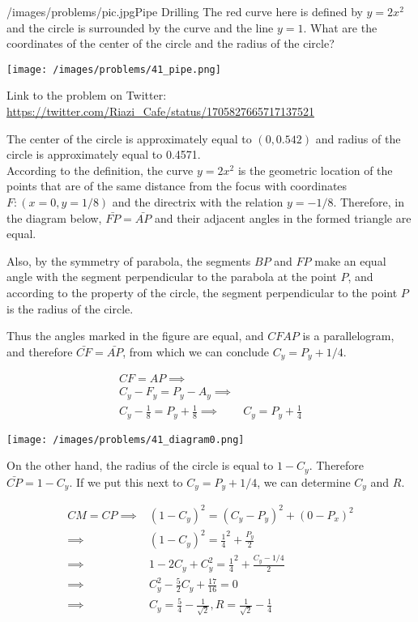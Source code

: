 \begin{problem}{/images/problems/pic.jpg}{Pipe Drilling}
	The red curve here is defined by $y = 2x^2$ and the circle is surrounded by the curve and the line $y=1$. What are the coordinates of the center of the circle and the radius of the circle?

\begin{center}
	\texttt{[image: /images/problems/41\_pipe.png]}
\end{center}

Link to the problem on Twitter: \url{https://twitter.com/Riazi_Cafe/status/1705827665717137521}
\end{problem}
\begin{solution}
The center of the circle is approximately equal to $(0,0.542)$ and radius of the circle is approximately equal to 0.4571.\\[0.2cm]

According to the definition, the curve $y=2x^2$ is the geometric location of the points that are of the same distance from the focus with coordinates $F: (x=0, y=1/8)$ and the directrix with the relation $y=-1/8$.
Therefore, in the diagram below, $\bar{FP}=\bar{AP}$ and their adjacent angles in the formed triangle are equal.

Also, by the symmetry of parabola, the segments $BP$ and $FP$ make an equal angle with the segment perpendicular to the parabola at the point $P$, and according to the property of the circle, the segment perpendicular to the point $P$ is the radius of the circle.

Thus the angles marked in the figure are equal, and $CFAP$ is a parallelogram, and therefore $\bar{CF}=\bar{AP}$, from which we can conclude $C_y=P_y+1/4$.

$$\begin{aligned}
CF = AP \implies& \\
C_y - F_y = P_y - A_y \implies& \\
C_y - \frac{1}{8} = P_y + \frac{1}{8} \implies& C_y=P_y+\frac{1}{4}
\end{aligned}$$

\begin{center}
	\texttt{[image: /images/problems/41\_diagram0.png]}
\end{center}

On the other hand, the radius of the circle is equal to $1-C_y$. Therefore $\bar{CP}=1-C_y$. If we put this next to $C_y=P_y+1/4$, we can determine $C_y$ and $R$.

$$\begin{aligned}
CM = CP \implies& (1 - C_y)^2 = (C_y - P_y)^2 + (0 - P_x)^2 \\
\implies& (1 - C_y)^2 = \frac{1}{4}^2 + \frac{P_y}{2} \\
\implies& 1 - 2C_y + C_y^2  = \frac{1}{4}^2 + \frac{C_y-1/4}{2} \\
\implies& C_y^2 - \frac{5}{2}C_y + \frac{17}{16} = 0 \\
\implies& C_y = \frac{5}{4} - \frac{1}{\sqrt{2}}, R = \frac{1}{\sqrt{2}} - \frac{1}{4}
\end{aligned}$$


\end{solution}